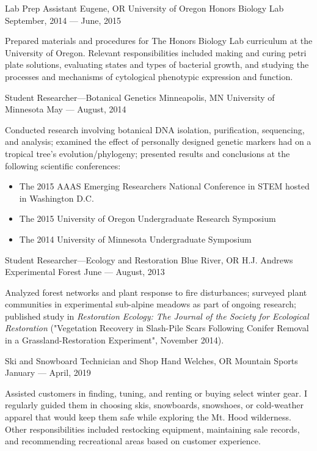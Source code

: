 
\showoff
{Lab Prep Assistant}
{Eugene, OR}
{University of Oregon Honors Biology Lab}
{September, 2014 --- June, 2015}

Prepared materials and procedures for The Honors Biology Lab curriculum at the University of Oregon. Relevant responsibilities included making and curing petri plate solutions, evaluating states and types of bacterial growth, and studying the processes and mechanisms of cytological phenotypic expression and function.

\myBreak

\showoff
{Student Researcher---Botanical Genetics}
{Minneapolis, MN}
{University of Minnesota}
{May --- August, 2014}

Conducted research involving botanical DNA isolation, purification, sequencing, and analysis; examined the effect of personally designed genetic markers had on a tropical tree’s evolution/phylogeny; presented results and conclusions at the following scientific conferences:
\begin{itemize}[label=$\triangleright$]
\item{The 2015 AAAS Emerging Researchers National Conference in STEM hosted in Washington D.C.}
\item{The 2015 University of Oregon Undergraduate Research Symposium}
\item{The 2014 University of Minnesota Undergraduate Symposium}
\end{itemize}

\myBreak

\showoff
{Student Researcher---Ecology and Restoration}
{Blue River, OR}
{H.J. Andrews Experimental Forest}
{June --- August, 2013}

Analyzed forest networks and plant response to fire disturbances; surveyed plant communities in experimental sub-alpine meadows as part of ongoing research; published study in \textit{Restoration Ecology: The Journal of the Society for Ecological Restoration} ("Vegetation Recovery in Slash-Pile Scars Following Conifer Removal in a Grassland-Restoration Experiment", November 2014).

\myBreak

\showoff
{Ski and Snowboard Technician and Shop Hand}
{Welches, OR}
{Mountain Sports}
{January --- April, 2019}

Assisted customers in finding, tuning, and renting or buying select winter gear. I regularly guided them in choosing skis, snowboards, snowshoes, or cold-weather apparel that would keep them safe while exploring the Mt. Hood wilderness. Other responsibilities included restocking equipment, maintaining sale records, and recommending recreational areas based on customer experience. 
